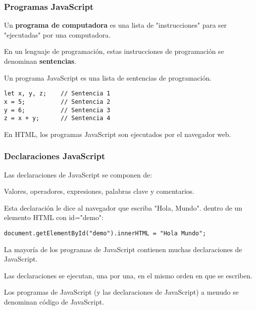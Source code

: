 \begin{frame}[fragile]
  \frametitle{Programas JavaScript}

  Un \textbf{programa de computadora} es una lista de
  "instrucciones" para ser "ejecutadas" por una computadora.

  \vspace{\baselineskip}
  En un lenguaje de programación, estas instrucciones de
  programación se denominan \textbf{sentencias}.

  \vspace{\baselineskip}
  Un programa JavaScript es una lista de sentencias de programación.

  \vspace{\baselineskip}
  \begin{lstlisting}
let x, y, z;    // Sentencia 1
x = 5;          // Sentencia 2
y = 6;          // Sentencia 3
z = x + y;      // Sentencia 4
  \end{lstlisting}

  \begin{exampleblock}{}
  En HTML, los programas JavaScript son ejecutados por el navegador web.
  \end{exampleblock}
\end{frame}

\begin{frame}[fragile]
  \frametitle{Declaraciones JavaScript}

  Las declaraciones de JavaScript se componen de:

  \vspace{\baselineskip}
  Valores, operadores, expresiones, palabras clave y comentarios.

  \vspace{\baselineskip}
  Esta declaración le dice al navegador que escriba "Hola, Mundo".
  dentro de un elemento HTML con id="demo":

  \vspace{\baselineskip}
  \begin{lstlisting}
document.getElementById("demo").innerHTML = "Hola Mundo";
  \end{lstlisting}

  \vspace{\baselineskip}
  La mayoría de los programas de JavaScript contienen muchas
  declaraciones de JavaScript.

  Las declaraciones se ejecutan, una por una, en el mismo orden
  en que se escriben.

  \begin{exampleblock}{}
    Los programas de JavaScript (y las declaraciones de JavaScript) a menudo se denominan código de JavaScript.
  \end{exampleblock}
\end{frame}

